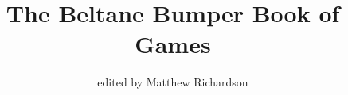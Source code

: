 


\documentclass[12pt,a4paper,titlepage,twoside,openright]{book}
\usepackage[latin1]{inputenc}
\usepackage{amsmath}
\usepackage{amsfonts}
\usepackage{amssymb}
\usepackage{makeidx}
\usepackage{fullpage}
\author{edited by Matthew Richardson}
\title{The Beltane Bumper Book of Games}
\date{}

\makeatletter
\newcommand{\game}[2]{
\@for \xx:=#2\do{
\index{\xx!{#1}}
}
\section[#1]{#1}
\setlength{\parindent}{1.1em}
\textbf{Categories:}\indent #2\\*
\setlength{\parindent}{0em}
}
\makeatother


\makeatletter
\newcommand{\equip}[1]{
\setlength{\parindent}{2.15em}
\textbf{Equipment:}
\@for \xy:=#1\do{
\xy\\*\indent\indent\indent
}
\setlength{\parindent}{0em}
}
\makeatother

\newcommand{\play}[1]{
\setlength{\parindent}{2.5em}
\textbf{Players:\indent} {#1}\\*
\setlength{\parindent}{0em}
}

\makeindex


\setcounter{secnumdepth}{-1}
\setlength{\parindent}{0cm}
\setlength{\parskip}{0.15cm}

\maketitle

\tableofcontents


\chapter[Games]{\begin{center}Games\end{center}}
\pagebreak















\printindex


